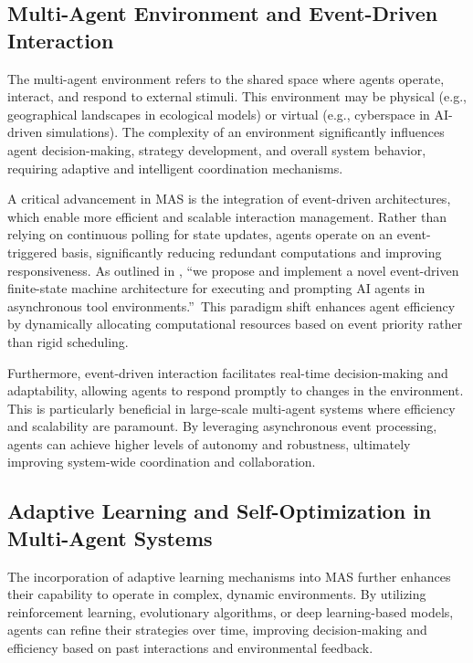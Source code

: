 \subsection{Multi-Agent Environment and Event-Driven Interaction}

The multi-agent environment refers to the shared space where agents operate, interact, and respond to external stimuli. This environment may be physical (e.g., geographical landscapes in ecological models) or virtual (e.g., cyberspace in AI-driven simulations). The complexity of an environment significantly influences agent decision-making, strategy development, and overall system behavior, requiring adaptive and intelligent coordination mechanisms.

A critical advancement in MAS is the integration of event-driven architectures, which enable more efficient and scalable interaction management. Rather than relying on continuous polling for state updates, agents operate on an event-triggered basis, significantly reducing redundant computations and improving responsiveness. As outlined in \cite{10}, \textquotedblleft we propose and implement a novel event-driven finite-state machine architecture for executing and prompting AI agents in asynchronous tool environments.\textquotedblright\ This paradigm shift enhances agent efficiency by dynamically allocating computational resources based on event priority rather than rigid scheduling.

Furthermore, event-driven interaction facilitates real-time decision-making and adaptability, allowing agents to respond promptly to changes in the environment. This is particularly beneficial in large-scale multi-agent systems where efficiency and scalability are paramount. By leveraging asynchronous event processing, agents can achieve higher levels of autonomy and robustness, ultimately improving system-wide coordination and collaboration.

\subsection{Adaptive Learning and Self-Optimization in Multi-Agent Systems}

The incorporation of adaptive learning mechanisms into MAS further enhances their capability to operate in complex, dynamic environments. By utilizing reinforcement learning, evolutionary algorithms, or deep learning-based models, agents can refine their strategies over time, improving decision-making and efficiency based on past interactions and environmental feedback.

